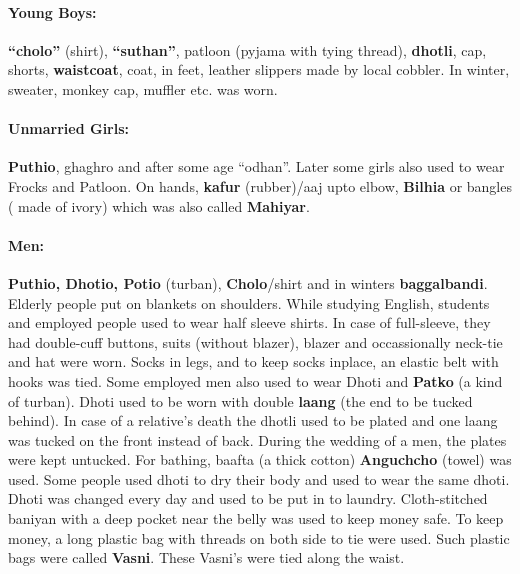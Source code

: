 \paragraph{Young Boys:} \textbf{``cholo''} (shirt), \textbf{``suthan''}, patloon
(pyjama with tying thread), \textbf{dhotli}, cap, shorts, \textbf{waistcoat},
coat, in feet, leather slippers made by local cobbler. In winter, sweater,
monkey cap, muffler etc. was worn.
\paragraph{Unmarried Girls:} \textbf{Puthio}, ghaghro and after some age
``odhan''. Later some girls also used to wear Frocks and Patloon. On hands,
\textbf{kafur} (rubber)/aaj upto elbow, \textbf{Bilhia} or bangles ( made of
ivory) which was also called \textbf{Mahiyar}.
\paragraph{Men:} \textbf{Puthio, Dhotio, Potio} (turban), \textbf{Cholo}/shirt
and in winters \textbf{baggalbandi}. Elderly people put on blankets on
shoulders. While studying English, students and employed people used to wear
half sleeve shirts. In case of full-sleeve, they had double-cuff buttons, suits
(without blazer), blazer and occassionally neck-tie and hat were worn. Socks in
legs, and to keep socks inplace, an elastic belt with hooks was tied. Some
employed men also used to wear Dhoti and \textbf{Patko} (a kind of turban).
Dhoti used to be worn with double \textbf{laang} (the end to be tucked behind).
In case of a relative's death the dhotli used to be plated and one laang was
tucked on the front instead of back. During the wedding of a men, the plates
were kept untucked.
For bathing, baafta (a thick cotton) \textbf{Anguchcho} (towel) was used. Some
people used dhoti to dry their body and used to wear the same dhoti. Dhoti was
changed every day and used to be put in to laundry. Cloth-stitched baniyan with
a deep pocket near the belly was used to keep money safe. To keep money, a long
plastic bag with threads on both side to tie were used. Such plastic bags were
called \textbf{Vasni}. These Vasni's were tied along the waist.
